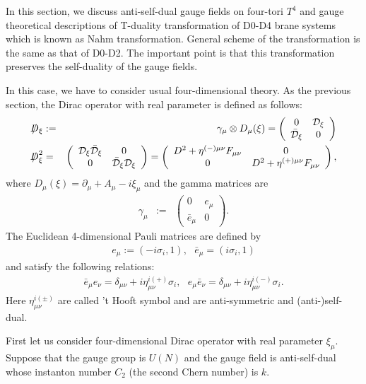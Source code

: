 \documentclass[a4paper,epsf,12pt]{article}
\newcommand{\ba}{\begin{array}}
\newcommand{\ea}{\end{array}}
\newcommand{\cD}{{\cal D}}
\newcommand{\del}{\partial}
\newcommand{\Dsl}{\mbox{\ooalign{\hfil/\hfil\crcr$D$}}}
\newcommand{\mn}{{\mu\nu}}
\def \cD{{\cal D}}
\def \cDb{{\bar {\cal D}}}
\def \0{{\bf 0}}
\begin{document}
In this section, we discuss anti-self-dual 
gauge fields on four-tori $T^4$ and 
gauge theoretical descriptions of T-duality transformation
of D0-D4 brane systems which is known as Nahm transformation.
General scheme of the transformation is the same as that of D0-D2.
The important point is that this transformation
preserves the self-duality of the gauge fields.

In this case, we have to consider usual four-dimensional theory.
As the previous section, 
the Dirac operator with real parameter is defined as follows:
\begin{eqnarray*}
\Dsl_\xi &:=& \gamma_\mu \otimes D_{\mu}(\xi)=
\left(
\ba{cc}
0&\cD_\xi\\\cDb_\xi&0
\ea
\right)\\
\Dsl_\xi^2
&=&
\left(
\ba{cc}
\cD_\xi\cDb_\xi&0\\0&\cDb_\xi\cD_\xi
\ea
\right)
=
\left(
\ba{cc}
D^2+\eta^{(-)\mn} F_\mn&0\\0&D^2+\eta^{(+)\mn} F_\mn
\ea
\right),
\end{eqnarray*}
where $D_{\mu}(\xi)=\del_\mu+A_\mu-i\xi_\mu$ and the gamma matrices are
\begin{eqnarray*}
\gamma_\mu&:=&\left(\ba{cc}0&e_\mu \\ \bar{e}_\mu &0\ea\right).
\end{eqnarray*}
The Euclidean 4-dimensional Pauli matrices are defined by
\begin{eqnarray*}
e_\mu:=(-i\sigma_i,1),~~~\bar{e}_\mu=(i\sigma_i,1)
\end{eqnarray*}
and satisfy the following relations:
\begin{eqnarray*}
\bar{e}_\mu e_\nu=\delta_\mn +i\eta_\mn^{i(+)}\sigma_i,~~~
e_\mu \bar{e}_\nu=\delta_\mn +i\eta_\mn^{i(-)}\sigma_i.
\end{eqnarray*}
Here $\eta_\mn^{i(\pm)}$ are called 't Hooft symbol and 
are anti-symmetric and (anti-)self-dual.

First let us consider four-dimensional Dirac operator
with real parameter $\xi_\mu$.
Suppose that the gauge group is $U(N)$ and 
the gauge field is anti-self-dual whose instanton number $C_2$
(the second Chern number) is $k$.
\end{document}
